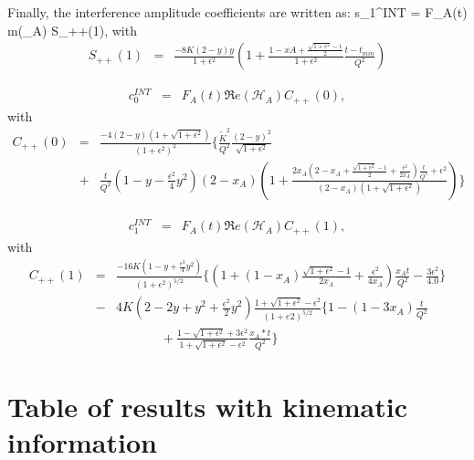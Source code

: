 \documentclass{article}
\let\oldequation\equation
\let\oldendequation\endequation
\renewenvironment{equation}
  {\linenomathNonumbers\oldequation}
  {\oldendequation\endlinenomath}
\begin{document}
Finally, the interference amplitude coefficients are written as:
\begin{equation}
s_{1}^{INT} = F_{A}(t) \Im m(_{A}) S_{++}(1),
\end{equation}
with
\begin{eqnarray}
   S_{++}(1) &=& \frac{-8K(2-y)y}{1+\epsilon^2} \left( 1 + 
\frac{1-xA+\frac{\sqrt{1+\epsilon^2}-1}{2}}{1+\epsilon^2} 
\frac{t-t_{min}}{Q^{2}} \right) \label{eq:s1I}
\end{eqnarray}

\begin{eqnarray}
c_0^{INT} &=& F_A(t) \Re e(\mathcal{H}_{A}) C_{++}(0),
\end{eqnarray}
with \begin{eqnarray}  C_{++}(0) &=&
\frac{-4(2-y)(1+\sqrt{1+\epsilon^{2}})}{(1+\epsilon^{2})^2}  \bigg\{ 
   \frac{\widetilde{K}^2}{Q^2}  \frac{(2-y)^2}{\sqrt{1+\epsilon^{2}}} \, \\
   &+& \frac{t}{Q^2}  \left( 1 - y - \frac{\epsilon^2}{4} y^2 \right)  
(2-x_{A}) \left(  1 + \frac{2x_A(2-x_A + \frac{\sqrt{1+\epsilon^{2}}-1}{2} + 
\frac{\epsilon^{2}}{2x_A})\frac{t}{Q^2} + \epsilon^{2}}{(2-x_A) 
(1+\sqrt{1+\epsilon^{2}})}  \right)  \bigg\} \nonumber
 \label{eq:c0I} 
 \end{eqnarray}

\begin{eqnarray}
   c_1^{INT} &=&  F_A(t) \Re e(\mathcal{H}_{A}) C_{++}(1),
\end{eqnarray}
with  
   \begin{eqnarray}
   C_{++}(1) &=&
   \frac{-16K(1-y+\frac{\epsilon^{2}}{4}y^2)}{(1+\epsilon^{2})^{5/2}}\bigg\{\left(1+(1-x_A)\frac{\sqrt{1+\epsilon^{2}}-1}{2x_A} 
   + \frac{\epsilon^{2}}{4x_A}\right) 
\frac{x_At}{Q^2}-\frac{3\epsilon^{2}}{4.0} \bigg\} \nonumber \\&-& 4K \left( 
2-2y+y^2+\frac{\epsilon^{2}}{2}y^2\right)\frac{1+\sqrt{1+\epsilon^{2}}-\epsilon^{2}}{(1+e2)^{5/2}}\bigg\{1-(1-3x_A)\frac{t}{Q^2}\nonumber\\&\,\,\,\,&\,\,\,\,\,\,\,\,\,\,\,\,\,\,\,\,\,\,\,\,\,+\frac{1-\sqrt{1+\epsilon^{2}}+3\epsilon^{2}}{1+\sqrt{1+\epsilon^{2}}-\epsilon^{2}} 
\frac{x_A*t}{Q^2}\bigg\} \label{eq:c1I}
\end{eqnarray}


\section{Table of results with kinematic information}
\label{sec:fullresults}
\end{document}
